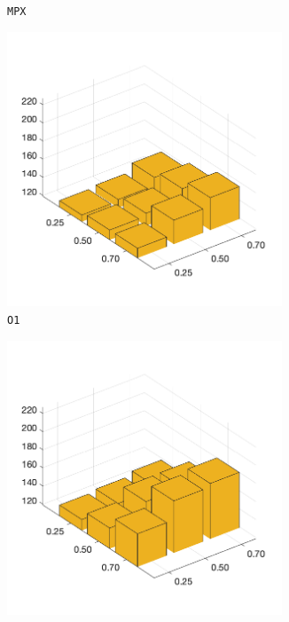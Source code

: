 \begin{figure}[H]
\begin{subfigure}[b]{0.25\textwidth}
		\caption{\texttt{MPX}}
		\label{fig:y}
    	\end{subfigure}
%
	\begin{subfigure}[b]{0.25\textwidth}
		\centering
		\includegraphics[width=0.9\textwidth]{crossover/min/cross_order_3.png}
		\caption{\texttt{O1}}
		\label{fig:z}
    	\end{subfigure}
%
	\begin{subfigure}[b]{0.25\textwidth}
		\centering
		\includegraphics[width=0.9\textwidth]{crossover/min/cross_order_based_3.png}

\end{subfigure}
\end{figure}
